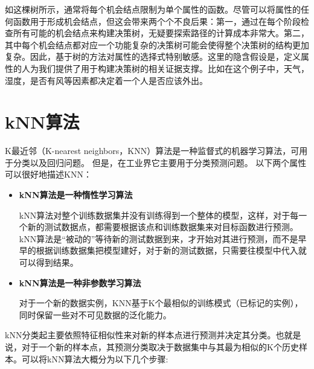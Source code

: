 如这棵树所示，通常将每个机会结点限制为单个属性的函数。尽管可以将属性的任何函数用于形成机会结点，但这会带来两个个不良后果：第一，通过在每个阶段检查所有可能的机会结点来构建决策树，无疑要探索路径的计算成本非常大。第二，其中每个机会结点都对应一个功能复杂的决策树可能会使得整个决策树的结构更加复杂。因此，基于树的方法对属性的选择式特别敏感。这里的隐含假设是，定义属性的人为我们提供了用于构建决策树的相关证据支撑。比如在这个例子中，天气，湿度，是否有风等因素都决定着一个人是否应该外出。


\section{kNN算法}


K最近邻（K-nearest neighbors，KNN）算法是一种监督式的机器学习算法，可用于分类以及回归问题。 但是，在工业界它主要用于分类预测问题。 以下两个属性可以很好地描述KNN：

\begin{itemize}

\item \textbf{kNN算法是一种惰性学习算法}

kNN算法对整个训练数据集并没有训练得到一个整体的模型，这样，对于每一个新的测试数据点，都需要根据该点和训练数据集来对目标函数进行预测。kNN算法是“被动的”等待新的测试数据到来，才开始对其进行预测，而不是早早的根据训练数据集把模型建好，对于新的测试数据，只需要往模型中代入就可以得到结果。

\item \textbf{kNN算法是一种非参数学习算法}

对于一个新的数据实例，KNN基于K个最相似的训练模式（已标记的实例），同时保留一些对不可见数据的泛化能力。

\end{itemize}

kNN分类起主要依照特征相似性来对新的样本点进行预测并决定其分类。也就是说，对于一个新的样本点，其预测分类取决于数据集中与其最为相似的K个历史样本。可以将kNN算法大概分为以下几个步骤:

